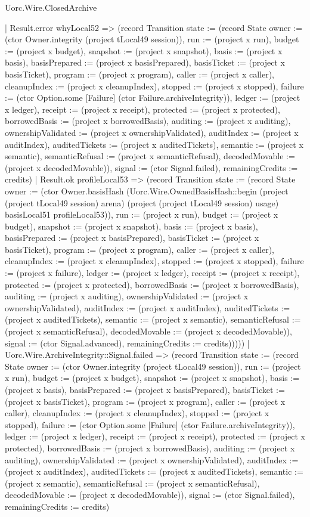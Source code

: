 \begin{lexlean}{Uorc.Wire.ClosedArchive}
\begin{semanticmodule}
{            | Result.error whyLocal52 => (record Transition {state := (record State {owner := (ctor Owner.integrity (project tLocal49 session)), run := (project x run), budget := (project x budget), snapshot := (project x snapshot), basis := (project x basis), basisPrepared := (project x basisPrepared), basisTicket := (project x basisTicket), program := (project x program), caller := (project x caller), cleanupIndex := (project x cleanupIndex), stopped := (project x stopped), failure := (ctor Option.some [Failure] (ctor Failure.archiveIntegrity)), ledger := (project x ledger), receipt := (project x receipt), protected := (project x protected), borrowedBasis := (project x borrowedBasis), auditing := (project x auditing), ownershipValidated := (project x ownershipValidated), auditIndex := (project x auditIndex), auditedTickets := (project x auditedTickets), semantic := (project x semantic), semanticRefusal := (project x semanticRefusal), decodedMovable := (project x decodedMovable)}), signal := (ctor Signal.failed), remainingCredits := credits})
            | Result.ok profileLocal53 => (record Transition {state := (record State {owner := (ctor Owner.basisHash (Uorc.Wire.OwnedBasisHash::begin (project (project tLocal49 session) arena) (project (project tLocal49 session) usage) basisLocal51 profileLocal53)), run := (project x run), budget := (project x budget), snapshot := (project x snapshot), basis := (project x basis), basisPrepared := (project x basisPrepared), basisTicket := (project x basisTicket), program := (project x program), caller := (project x caller), cleanupIndex := (project x cleanupIndex), stopped := (project x stopped), failure := (project x failure), ledger := (project x ledger), receipt := (project x receipt), protected := (project x protected), borrowedBasis := (project x borrowedBasis), auditing := (project x auditing), ownershipValidated := (project x ownershipValidated), auditIndex := (project x auditIndex), auditedTickets := (project x auditedTickets), semantic := (project x semantic), semanticRefusal := (project x semanticRefusal), decodedMovable := (project x decodedMovable)}), signal := (ctor Signal.advanced), remainingCredits := credits})))))
    | Uorc.Wire.ArchiveIntegrity::Signal.failed => (record Transition {state := (record State {owner := (ctor Owner.integrity (project tLocal49 session)), run := (project x run), budget := (project x budget), snapshot := (project x snapshot), basis := (project x basis), basisPrepared := (project x basisPrepared), basisTicket := (project x basisTicket), program := (project x program), caller := (project x caller), cleanupIndex := (project x cleanupIndex), stopped := (project x stopped), failure := (ctor Option.some [Failure] (ctor Failure.archiveIntegrity)), ledger := (project x ledger), receipt := (project x receipt), protected := (project x protected), borrowedBasis := (project x borrowedBasis), auditing := (project x auditing), ownershipValidated := (project x ownershipValidated), auditIndex := (project x auditIndex), auditedTickets := (project x auditedTickets), semantic := (project x semantic), semanticRefusal := (project x semanticRefusal), decodedMovable := (project x decodedMovable)}), signal := (ctor Signal.failed), remainingCredits := credits})
}
\end{semanticmodule}
\end{lexlean}
